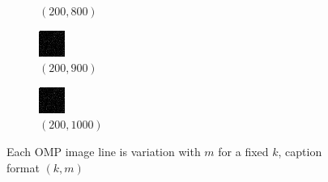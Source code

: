\documentclass[a4paper, landscape]{article}
\begin{document}
\begin{figure}[H]
\begin{subfigure}{0.09\linewidth}
        \caption*{$(200, 800)$}
    \end{subfigure}
    \begin{subfigure}{0.09\linewidth}
        \centering
        \includegraphics[width=\linewidth]{omp/k = 200, m = 900.png}
        \caption*{$(200, 900)$}
    \end{subfigure}
    \begin{subfigure}{0.09\linewidth}
        \centering
        \includegraphics[width=\linewidth]{omp/k = 200, m = 1000.png}
        \caption*{$(200, 1000)$}
    \end{subfigure}
    \caption{Each OMP image line is variation with $m$ for a fixed $k$, caption format $(k, m)$}
    \label{fig:k}
\end{figure}
\end{document}
